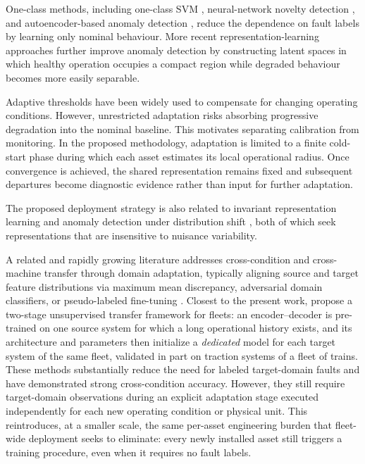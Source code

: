 \documentclass[numbered]{trbunofficial}
\begin{document}
One-class methods, including one-class SVM \citep{scholkopf1999},
neural-network novelty detection \citep{bishop1994}, and autoencoder-based
anomaly detection \citep{hinton2006,sakurada2014}, reduce the dependence on
fault labels by learning only nominal behaviour. More recent
representation-learning approaches further improve anomaly detection by
constructing latent spaces in which healthy operation occupies a compact
region while degraded behaviour becomes more easily separable.

Adaptive thresholds have been widely used to compensate for changing
operating conditions. However, unrestricted adaptation risks absorbing
progressive degradation into the nominal baseline. This motivates separating
calibration from monitoring. In the proposed methodology, adaptation is
limited to a finite cold-start phase during which each asset estimates its
local operational radius. Once convergence is achieved, the shared
representation remains fixed and subsequent departures become diagnostic
evidence rather than input for further adaptation.

The proposed deployment strategy is also related to invariant
representation learning \citep{bronstein2021} and anomaly detection under
distribution shift \citep{li2023invariant}, both of which seek
representations that are insensitive to nuisance variability.

A related and rapidly growing literature addresses cross-condition and
cross-machine transfer through domain adaptation, typically aligning source
and target feature distributions via maximum mean discrepancy, adversarial
domain classifiers, or pseudo-labeled fine-tuning
\citep{nguyen2025subdomain,ning2026digitaltwin}. Closest to the present work,
\citet{wang2026fleet} propose a two-stage unsupervised transfer framework for
fleets: an encoder--decoder is pre-trained on one source system for which a
long operational history exists, and its architecture and parameters then
initialize a \emph{dedicated} model for each target system of the same fleet,
validated in part on traction systems of a fleet of trains. These methods
substantially reduce the need for labeled target-domain faults and have
demonstrated strong cross-condition accuracy. However, they still require
target-domain observations during an explicit adaptation stage executed
independently for each new operating condition or physical unit. This
reintroduces, at a smaller scale, the same per-asset engineering burden that
fleet-wide deployment seeks to eliminate: every newly installed asset still
triggers a training procedure, even when it requires no fault labels.
\end{document}
